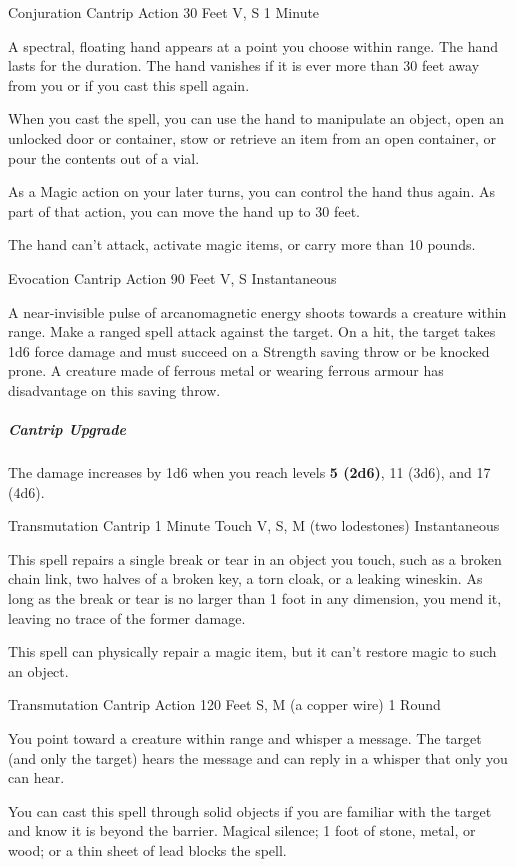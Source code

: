 \documentclass[letterpaper,openany,oneside,twocolumn]{book}
\begin{document}
	{Conjuration Cantrip}
	{Action}
	{30 Feet}
	{V, S}
	{1 Minute}

A spectral, floating hand appears at a point you choose within range. The hand lasts for the duration. The hand vanishes if it is ever more than 30 feet away from you or if you cast this spell again.

When you cast the spell, you can use the hand to manipulate an object, open an unlocked door or container, stow or retrieve an item from an open container, or pour the contents out of a vial.

As a Magic action on your later turns, you can control the hand thus again. As part of that action, you can move the hand up to 30 feet.

The hand can't attack, activate magic items, or carry more than 10 pounds.

	{Evocation Cantrip}
	{Action}
	{90 Feet}
	{V, S}
	{Instantaneous}

A near-invisible pulse of arcanomagnetic energy shoots towards a creature within range. Make a ranged spell attack against the target. On a hit, the target takes 1d6 force damage and must succeed on a Strength saving throw or be knocked prone. A creature made of ferrous metal or wearing ferrous armour has disadvantage on this saving throw.

\subparagraph*{Cantrip Upgrade} The damage increases by 1d6 when you reach levels \textbf{5 (2d6)}, 11 (3d6), and 17 (4d6).

	{Transmutation Cantrip}
	{1 Minute}
	{Touch}
	{V, S, M (two lodestones)}
	{Instantaneous}

This spell repairs a single break or tear in an object you touch, such as a broken chain link, two halves of a broken key, a torn cloak, or a leaking wineskin. As long as the break or tear is no larger than 1 foot in any dimension, you mend it, leaving no trace of the former damage.

This spell can physically repair a magic item, but it can't restore magic to such an object.

	{Transmutation Cantrip}
	{Action}
	{120 Feet}
	{S, M (a copper wire)}
	{1 Round}

You point toward a creature within range and whisper a message. The target (and only the target) hears the message and can reply in a whisper that only you can hear.

You can cast this spell through solid objects if you are familiar with the target and know it is beyond the barrier. Magical silence; 1 foot of stone, metal, or wood; or a thin sheet of lead blocks the spell.
\end{document}
